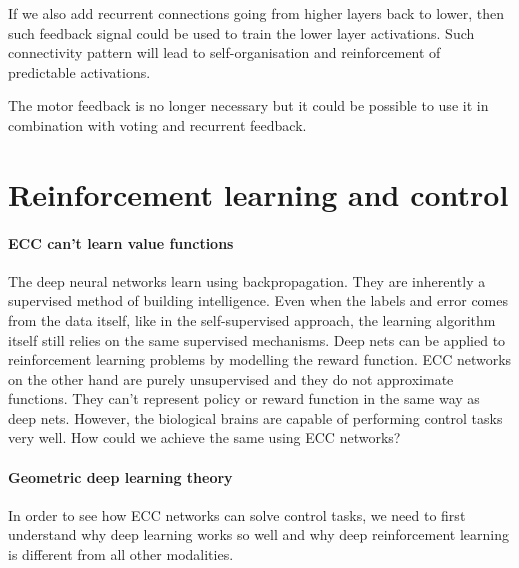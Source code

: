 \documentclass[12pt]{article}
\begin{document}
If we also add recurrent connections going from higher layers back to lower, then such feedback signal could be used to train the lower layer activations. Such connectivity pattern will lead to self-organisation and reinforcement of predictable activations.

The motor feedback is no longer necessary but it could be possible to use it in combination with voting and recurrent feedback.
 
\section{Reinforcement learning and control}

\paragraph{ECC can't learn value functions}

The deep neural networks learn using backpropagation. They are inherently a supervised method of building intelligence. Even when the labels and error comes from the data itself, like in the self-supervised approach, the learning algorithm itself still relies on the same supervised mechanisms. Deep nets can be applied to reinforcement learning problems by modelling the reward function. ECC networks on the other hand are purely unsupervised and they do not approximate functions. They can't represent policy or reward function in the same way as deep nets. However, the biological brains are capable of performing control tasks very well. How could we achieve the same using ECC networks?

\paragraph{Geometric deep learning theory}

In order to see how ECC networks can solve control tasks, we need to first understand why deep learning works so well and why deep reinforcement learning is different from all other modalities. 
\end{document}
